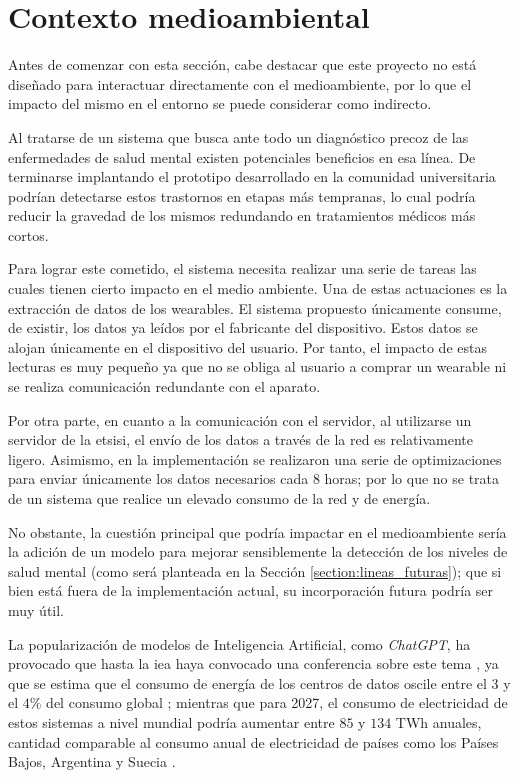 \section{Contexto medioambiental}

    Antes de comenzar con esta sección, cabe destacar que este proyecto no está diseñado para interactuar directamente con el medioambiente, por lo que el impacto del mismo en el entorno se puede considerar como indirecto.

    Al tratarse de un sistema que busca ante todo un diagnóstico precoz de las enfermedades de salud mental existen potenciales beneficios en esa línea. De terminarse implantando el prototipo desarrollado en la comunidad universitaria podrían detectarse estos trastornos en etapas más tempranas, lo cual podría reducir la gravedad de los mismos redundando en tratamientos médicos más cortos.

    Para lograr este cometido, el sistema necesita realizar una serie de tareas las cuales tienen cierto impacto en el medio ambiente. Una de estas actuaciones es la extracción de datos de los \glspl{wearable}. El sistema propuesto únicamente consume, de existir, los datos ya leídos por el fabricante del dispositivo. Estos datos se alojan únicamente en el dispositivo del usuario. Por tanto, el impacto de estas lecturas es muy pequeño ya que no se obliga al usuario a comprar un \gls{wearable} ni se realiza comunicación redundante con el aparato.

    Por otra parte, en cuanto a la comunicación con el servidor, al utilizarse un servidor de la \gls{etsisi}, el envío de los datos a través de la red es relativamente ligero. Asimismo, en la implementación se realizaron una serie de optimizaciones para enviar únicamente los datos necesarios cada 8 horas; por lo que no se trata de un sistema que realice un elevado consumo de la red y de energía.

    No obstante, la cuestión principal que podría impactar en el medioambiente
    sería la adición de un modelo para mejorar sensiblemente la detección de los niveles de salud mental (como será planteada en la Sección \ref{section:lineas_futuras}); que si bien está fuera de la implementación actual, su incorporación futura podría ser muy útil. 
    
    La popularización de modelos de Inteligencia Artificial, como \textit{ChatGPT}, ha provocado que hasta la \gls{iea} haya convocado una conferencia sobre este tema \cite{perez_demanda_2024}, ya que se estima que el consumo de energía de los centros de datos oscile entre el $3$ y el $4\%$ del consumo global \cite{gijon_inteligencia_2024}; mientras que para 2027, el consumo de electricidad de estos sistemas a nivel mundial podría aumentar entre $85$ y $134$ TWh anuales, cantidad comparable al consumo anual de electricidad de países como los Países Bajos, Argentina y Suecia \cite{redaccion_inteligencia_2023}.
    
